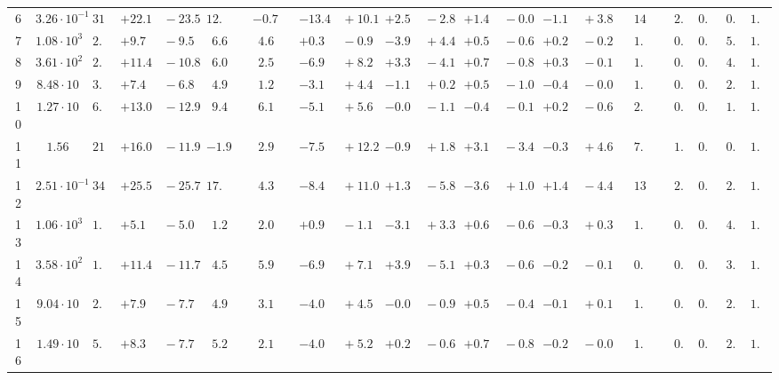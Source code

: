 \documentclass[12pt]{article}
\begin{document}
\begin{table}
\begin{tabular}{ccrr@{\hskip0pt}rrc@{\hskip0pt}r@{\hskip0pt}c@{\hskip0pt}r@{\hskip0pt}rr@{\hskip0pt}rr@{\hskip0pt}rr@{\hskip0pt}rr@{\hskip0pt}r@{\hskip0pt}r@{\hskip0pt}c|rr|r}
6 &$3.26 \cdot 10^{-1}$ &$31.1$  & ${+22.1~}$&${~-23.5}$ & $12.0$  & &$-0.7$&&${-13.4~}$&${~+10.1}$ & ${+2.5~}$&${~-2.8}$ & ${+1.4~}$&${~-0.0}$ & ${-1.1~}$&${~+3.8}$ & &$14.2$&&$ 2.8$  & $0.95$  & $ 0.2$  & $1.05$   \\ 
7 &$1.08 \cdot 10^{3}$ &$ 2.0$  & ${+9.7~}$&${~-9.5}$ & $ 6.6$  & &$ 4.6$&&${+0.3~}$&${~-0.9}$ & ${-3.9~}$&${~+4.4}$ & ${+0.5~}$&${~-0.6}$ & ${+0.2~}$&${~-0.2}$ & &$ 1.2$&&$ 0.4$  & $0.87$  & $ 5.4$  & $1.02$   \\ 
8 &$3.61 \cdot 10^{2}$ &$ 2.1$  & ${+11.4~}$&${~-10.8}$ & $ 6.0$  & &$ 2.5$&&${-6.9~}$&${~+8.2}$ & ${+3.3~}$&${~-4.1}$ & ${+0.7~}$&${~-0.8}$ & ${+0.3~}$&${~-0.1}$ & &$ 1.1$&&$ 0.3$  & $0.90$  & $ 4.2$  & $1.02$   \\ 
9 &$8.48 \cdot 10$ &$ 3.0$  & ${+7.4~}$&${~-6.8}$ & $ 4.9$  & &$ 1.2$&&${-3.1~}$&${~+4.4}$ & ${-1.1~}$&${~+0.2}$ & ${+0.5~}$&${~-1.0}$ & ${-0.4~}$&${~-0.0}$ & &$ 1.2$&&$ 0.7$  & $0.93$  & $ 2.8$  & $1.02$   \\ 
10 &$1.27 \cdot 10$ &$ 6.9$  & ${+13.0~}$&${~-12.9}$ & $ 9.4$  & &$ 6.1$&&${-5.1~}$&${~+5.6}$ & ${-0.0~}$&${~-1.1}$ & ${-0.4~}$&${~-0.1}$ & ${+0.2~}$&${~-0.6}$ & &$ 2.2$&&$ 0.6$  & $0.95$  & $ 1.9$  & $1.03$   \\ 
11 &$1.56$ &$21.2$  & ${+16.0~}$&${~-11.9}$ & $-1.9$  & &$ 2.9$&&${-7.5~}$&${~+12.2}$ & ${-0.9~}$&${~+1.8}$ & ${+3.1~}$&${~-3.4}$ & ${-0.3~}$&${~+4.6}$ & &$ 7.2$&&$ 1.3$  & $0.95$  & $ 0.9$  & $1.04$   \\ 
12 &$2.51 \cdot 10^{-1}$ &$34.8$  & ${+25.5~}$&${~-25.7}$ & $17.8$  & &$ 4.3$&&${-8.4~}$&${~+11.0}$ & ${+1.3~}$&${~-5.8}$ & ${-3.6~}$&${~+1.0}$ & ${+1.4~}$&${~-4.4}$ & &$13.2$&&$ 2.8$  & $0.96$  & $ 2.0$  & $1.03$   \\ 
13 &$1.06 \cdot 10^{3}$ &$ 1.9$  & ${+5.1~}$&${~-5.0}$ & $ 1.2$  & &$ 2.0$&&${+0.9~}$&${~-1.1}$ & ${-3.1~}$&${~+3.3}$ & ${+0.6~}$&${~-0.6}$ & ${-0.3~}$&${~+0.3}$ & &$ 1.0$&&$ 0.2$  & $0.88$  & $ 4.7$  & $1.02$   \\ 
14 &$3.58 \cdot 10^{2}$ &$ 1.9$  & ${+11.4~}$&${~-11.7}$ & $ 4.5$  & &$ 5.9$&&${-6.9~}$&${~+7.1}$ & ${+3.9~}$&${~-5.1}$ & ${+0.3~}$&${~-0.6}$ & ${-0.2~}$&${~-0.1}$ & &$ 0.9$&&$ 0.6$  & $0.91$  & $ 3.8$  & $1.02$   \\ 
15 &$9.04 \cdot 10$ &$ 2.7$  & ${+7.9~}$&${~-7.7}$ & $ 4.9$  & &$ 3.1$&&${-4.0~}$&${~+4.5}$ & ${-0.0~}$&${~-0.9}$ & ${+0.5~}$&${~-0.4}$ & ${-0.1~}$&${~+0.1}$ & &$ 1.0$&&$ 0.8$  & $0.93$  & $ 2.8$  & $1.03$   \\ 
16 &$1.49 \cdot 10$ &$ 5.9$  & ${+8.3~}$&${~-7.7}$ & $ 5.2$  & &$ 2.1$&&${-4.0~}$&${~+5.2}$ & ${+0.2~}$&${~-0.6}$ & ${+0.7~}$&${~-0.8}$ & ${-0.2~}$&${~-0.0}$ & &$ 1.7$&&$ 0.8$  & $0.95$  & $ 2.0$  & $1.04$   \\ 

\end{tabular}
\end{table}
\end{document}
